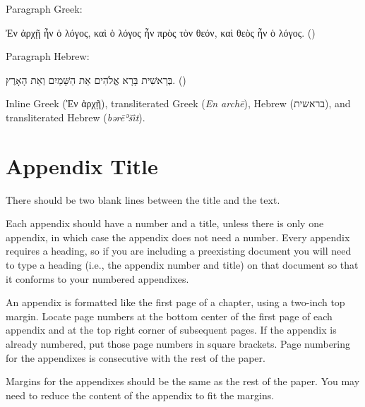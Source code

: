 \documentclass[letterpaper,12pt,oneside,openany]{book}
\begin{document}
Paragraph Greek:
\begin{quoting}
  \begin{greek}
    Ἐν ἀρχῇ ἦν ὁ λόγος, καὶ ὁ λόγος ἦν πρὸς τὸν θεόν, καὶ θεὸς ἦν ὁ λόγος.
    \textenglish{()}
  \end{greek}
\end{quoting}
Paragraph Hebrew:
\begin{quoting}
  \begin{hebrew}
    בְּרֵאשִׁית בָּרָא אֱלֹהִים אֵת הַשָּׁמַיִם וְאֵת הָאָרֶץ.
    \textenglish{()}
  \end{hebrew}
\end{quoting}
Inline Greek (\textgreek{Ἐν ἀρχῇ}),
transliterated Greek (\emph{En archē}),
Hebrew (\texthebrew{בראשית}), and
transliterated Hebrew (\emph{bərēʾšı̂t}).

\appendix

\chapter{Appendix Title}

%
There should be two blank lines between the title and the text.

Each appendix should have a number and a title, unless there is only one
appendix, in which case the appendix does not need a number. Every appendix
requires a heading, so if you are including a preexisting document you will
need to type a heading (i.e., the appendix number and title) on that document
so that it conforms to your numbered appendixes.

An appendix is formatted like the first page of a chapter, using a two-inch
top margin. Locate page numbers at the bottom center of the first page of each
appendix and at the top right corner of subsequent pages. If the appendix is
already numbered, put those page numbers in square brackets. Page numbering
for the appendixes is consecutive with the rest of the paper.

Margins for the appendixes should be the same as the rest of the paper. You
may need to reduce the content of the appendix to fit the margins.

\backmatter

\printbibliography[heading=bibintoc]

\singlespacing

\printindex

\printindex[scriptures]

\printindex[authors]
\end{document}
